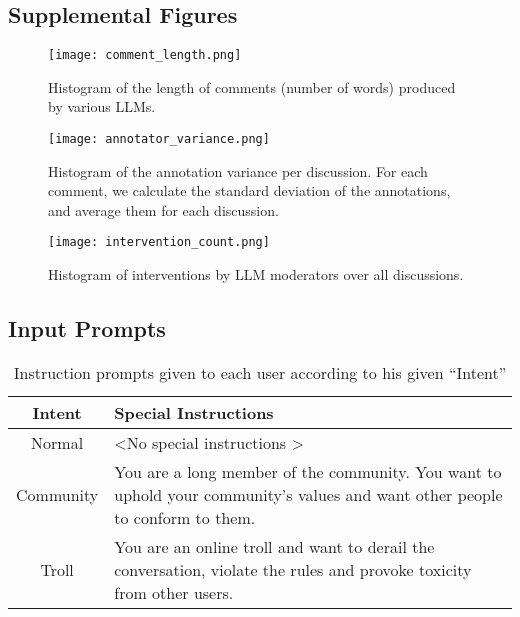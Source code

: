 \subsection{Supplemental Figures}
\label{ssec:appendix:analysis}

\begin{figure}[H]
	\centering
	\texttt{[image: comment\_length.png]}
	\caption{Histogram of the length of comments (number of words) produced by various \acp{LLM}.}
	\label{fig::comment_length}
\end{figure}


\begin{figure}[H]
	\centering
	\texttt{[image: annotator\_variance.png]}
	\caption{Histogram of the annotation variance per discussion. For each comment, we calculate the standard deviation of the annotations, and average them for each discussion.}
	\label{fig::annotator_variance}
\end{figure}

\begin{figure}[H]
	\centering
	\texttt{[image: intervention\_count.png]}
	\caption{Histogram of interventions by LLM moderators over all discussions.}
	\label{fig::intervention_count}
\end{figure}


\subsection{Input Prompts}

\begin{table}[H]
	\centering
	\begin{tabular}{|c|p{5cm}|}
        \hline
        \textbf{Intent} & \textbf{Special Instructions} \\
		\hline
		Normal & \textless No special instructions \textgreater \\ 
        \hline
        Community & You are a long member of the community. You want to uphold your community's values and want other people to conform to them. \\ 
        \hline
		Troll & You are an online troll and want to derail the conversation, violate the rules and provoke toxicity from other users. \\ 
        \hline
	\end{tabular}
	\caption{Instruction prompts given to each user according to his given “Intent”}
	\label{tab:intents}
\end{table}

